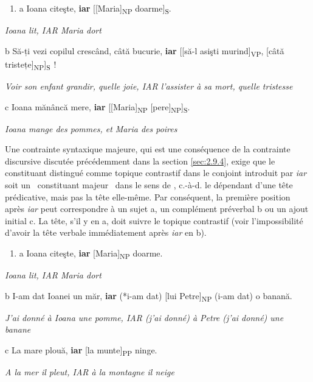 \begin{enumerate}
\item \label{bkm:Ref301984133}a  Ioana citeşte, \textbf{iar} [[Maria]\textsubscript{NP} doarme]\textsubscript{S}.


\end{enumerate}
{\itshape
Ioana lit, IAR Maria dort}

  b  Să-ți vezi copilul crescând, câtă bucurie, \textbf{iar} [[să-l asişti  murind]\textsubscript{VP}, [câtă tristețe]\textsubscript{NP}]\textsubscript{S~}!

{\itshape
Voir son enfant grandir, quelle joie, IAR l'assister à sa mort, quelle tristesse} 

  c  Ioana mănâncă mere, \textbf{iar} [[Maria]\textsubscript{NP} [pere]\textsubscript{NP}]\textsubscript{S}.

{\itshape
Ioana mange des pommes, et Maria des poires} 

Une contrainte syntaxique majeure, qui est une conséquence de la contrainte discursive discutée précédemment dans la section \ref{sec:2.9.4}, exige que le constituant distingué comme topique contrastif dans le conjoint introduit par \textit{iar} soit un {\guillemotleft}~constituant majeur~{\guillemotright} dans le sens de \citet{Hankamer1971}, c.-à-d. le dépendant d'une tête prédicative, mais pas la tête elle-même. Par conséquent, la première position après \textit{iar} peut correspondre à un sujet a, un complément préverbal b ou un ajout initial c. La tête, s'il y en a, doit suivre le topique contrastif (voir l'impossibilité d'avoir la tête verbale immédiatement après \textit{iar} en b).


\begin{enumerate}
\item \label{bkm:Ref301985166}a  Ioana citeşte, \textbf{iar} [Maria]\textsubscript{NP} doarme.


\end{enumerate}
{\itshape
Ioana lit, IAR Maria dort}

  b  I-am dat Ioanei un măr, \textbf{iar} (*i-am dat) [lui Petre]\textsubscript{NP} (i-am dat) o banană.

{\itshape
J'ai donné à Ioana une pomme, IAR (j'ai donné) à Petre (j'ai donné) une banane} 

  c  La mare plouă, \textbf{iar} [la munte]\textsubscript{PP} ninge.

{\itshape
A la mer il pleut, IAR à la montagne il neige} 

